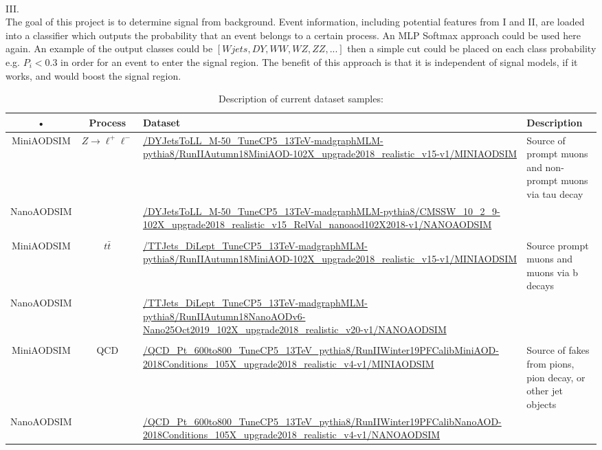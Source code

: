 \documentclass[10pt,a4paper]{article}
\begin{document}
\quad \quad \\
III.  \\
The goal of this project is to determine signal from background. Event information, including potential features from I and II, are loaded into a classifier which outputs the probability that an event belongs to a certain process. An MLP Softmax approach could be used here again. An example of the output classes could be $[Wjets, DY, WW, WZ, ZZ, ...]$ then a simple cut could be placed on each class probability e.g. $P_i < 0.3$ in order for an event to enter the signal region. The benefit of this approach is that it is independent of signal models, if it works, and would boost the signal region.

\begin{table}[h!]
\begin{adjustwidth}{-1.3in}{-1.3in}
\begin{center}
\caption{Description of current dataset samples:}
\begin{tabular}{|c|c|p{}|p{}|}
\hline 
• & Process & Dataset & Description \\ 
\hline 
MiniAODSIM & $Z\rightarrow \ell^+ \ell^-$ & \url{/DYJetsToLL_M-50_TuneCP5_13TeV-madgraphMLM-pythia8/RunIIAutumn18MiniAOD-102X_upgrade2018_realistic_v15-v1/MINIAODSIM} & Source of prompt muons and non-prompt muons via tau decay \\ 

NanoAODSIM &  & \url{/DYJetsToLL_M-50_TuneCP5_13TeV-madgraphMLM-pythia8/CMSSW_10_2_9-102X_upgrade2018_realistic_v15_RelVal_nanoaod102X2018-v1/NANOAODSIM} &    \\ 
\hline 
 &  &  &  \\ 
\hline 
MiniAODSIM & $t\bar{t}$ & \url{/TTJets_DiLept_TuneCP5_13TeV-madgraphMLM-pythia8/RunIIAutumn18MiniAOD-102X_upgrade2018_realistic_v15-v1/MINIAODSIM}  & Source prompt muons and muons via b decays \\ 

NanoAODSIM &  & \url{/TTJets_DiLept_TuneCP5_13TeV-madgraphMLM-pythia8/RunIIAutumn18NanoAODv6-Nano25Oct2019_102X_upgrade2018_realistic_v20-v1/NANOAODSIM} &  \\ 
\hline 
 &  &  &  \\ 
\hline 
MiniAODSIM & QCD & \url{/QCD_Pt_600to800_TuneCP5_13TeV_pythia8/RunIIWinter19PFCalibMiniAOD-2018Conditions_105X_upgrade2018_realistic_v4-v1/MINIAODSIM} & Source of fakes from pions, pion decay, or other jet objects  \\ 

NanoAODSIM &  & \url{/QCD_Pt_600to800_TuneCP5_13TeV_pythia8/RunIIWinter19PFCalibNanoAOD-2018Conditions_105X_upgrade2018_realistic_v4-v1/NANOAODSIM} &  \\ 
\hline 
\end{tabular} 
\end{center}
\end{adjustwidth}
\end{table}
\end{document}
